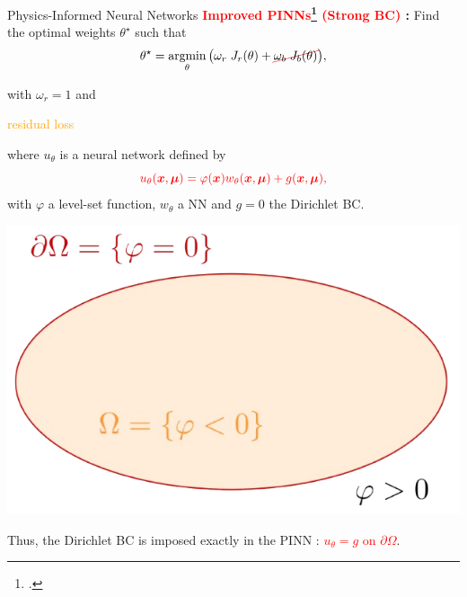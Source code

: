 \begin{frame}[noframenumbering]{Physics-Informed Neural Networks}
	\textbf{\textcolor{red}{Improved PINNs\footcite{LagLikFot1998,FraMicNav2024} (Strong BC)} :} Find the optimal weights $\theta^\star$ such that
	\begin{equation*}
		\theta^\star = \argmin_{\theta}	\big( \omega_r \; J_r(\theta) + \Ccancel[red]{\omega_b \; J_b(\theta)} \big),%
	\end{equation*}
	
	\vspace{-5pt}
	with $\omega_r=1$ and
	\vspace{5pt}

	\begin{minipage}{0.2\linewidth}
		\flushright
		\textcolor{orange}{residual loss}
	\end{minipage}
	\begin{minipage}{0.68\linewidth}
		\centering
	\end{minipage}

	\vspace{15pt}
	\begin{minipage}{0.75\linewidth}
		where $u_\theta$ is a neural network defined by
		\begin{equation*}
			\textcolor{red}{u_{\theta}(\bm{x},\bm{\mu}) = \varphi(\bm{x}) w_{\theta}(\bm{x},\bm{\mu}) + g(\bm{x},\bm{\mu}),}
		\end{equation*}
		with $\varphi$ a level-set function, $w_\theta$ a NN and $g=0$ the Dirichlet BC. 
	\end{minipage}
	\begin{minipage}{0.23\linewidth}
		\vspace{-15pt}
		\hspace{-23pt}\includegraphics[width=1.3\linewidth]{images/intro/levelset.png}
	\end{minipage}

	\vspace{5pt}
	Thus, the Dirichlet BC is imposed exactly in the PINN : \textcolor{red}{$u_{\theta} = g$ on $\partial \Omega$}.

	\vspace{15pt}
\end{frame}


